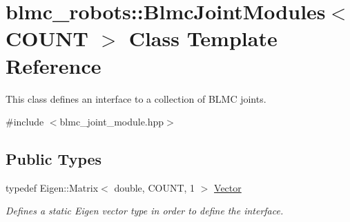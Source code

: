 \hypertarget{classblmc__robots_1_1BlmcJointModules}{}\section{blmc\+\_\+robots\+:\+:Blmc\+Joint\+Modules$<$ C\+O\+U\+NT $>$ Class Template Reference}
\label{classblmc__robots_1_1BlmcJointModules}


This class defines an interface to a collection of B\+L\+MC joints.  




{\ttfamily \#include $<$blmc\+\_\+joint\+\_\+module.\+hpp$>$}

\subsection*{Public Types}
\begin{DoxyCompactItemize}
\item 
typedef Eigen\+::\+Matrix$<$ double, C\+O\+U\+NT, 1 $>$ \hyperlink{classblmc__robots_1_1BlmcJointModules_abaff382c6fd4b494ec0c17498d94919e}{Vector}\hypertarget{classblmc__robots_1_1BlmcJointModules_abaff382c6fd4b494ec0c17498d94919e}{}\label{classblmc__robots_1_1BlmcJointModules_abaff382c6fd4b494ec0c17498d94919e}

\begin{DoxyCompactList}\small\item\em Defines a static Eigen vector type in order to define the interface. \end{DoxyCompactList}\end{DoxyCompactItemize}
